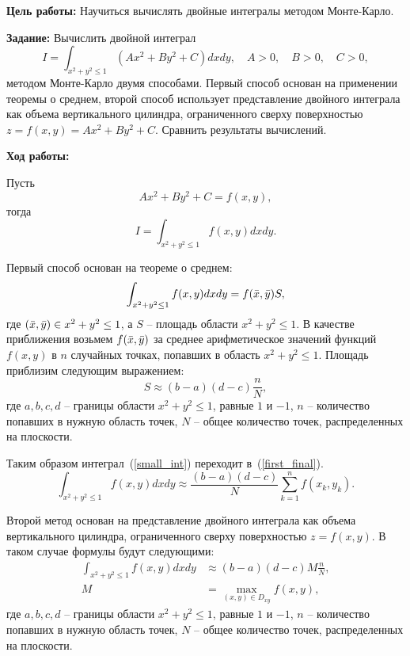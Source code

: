 \justifying
\textbf{Цель работы:}
Научиться вычислять двойные интегралы методом Монте-Карло.

\textbf{Задание:}
Вычислить двойной интеграл
\begin{equation}\label{init_int}
    I = \int_{x ^ 2 + y ^ 2 \leq 1} (A x ^ 2 + B y ^ 2 + C) dx dy, \quad A > 0, \quad B > 0, \quad C > 0,
\end{equation}
методом Монте-Карло двумя способами. Первый способ основан на применении теоремы о среднем, второй способ использует представление двойного интеграла как объема вертикального цилиндра, ограниченного сверху поверхностью $z = f(x, y) = A x ^ 2 + B y ^ 2 + C$. Сравнить результаты вычислений.

\textbf{Ход работы:}

Пусть
\begin{equation}
    A x ^ 2 + B y ^ 2 + C = f(x, y),
\end{equation}
тогда 
\begin{equation}\label{small_int}
    I = \int_{x ^ 2 + y ^ 2 \leq 1} f(x, y) dx dy.
\end{equation}

Первый способ основан на теореме о среднем:
\begin{equation}
    \int_{x ^ 2 + y ^ 2 \leq 1} f(x, y) dx dy = f(\Bar{x}, \Bar{y}) S,
\end{equation}
где $(\Bar{x}, \Bar{y}) \in x ^ 2 + y ^ 2 \leq 1$, а $S$ -- площадь области $x ^ 2 + y ^ 2 \leq 1$. В качестве приближения возьмем $f(\Bar{x}, \Bar{y})$ за среднее арифметическое значений функций $f(x, y)$ в $n$ случайных точках, попавших в область $x ^ 2 + y ^ 2 \leq 1$. Площадь приблизим следующим выражением:
\begin{equation}
    S \approx (b - a)(d - c) \frac{n}{N},
\end{equation}
где $a, b, c, d$ -- границы области $x ^ 2 + y ^ 2 \leq 1$, равные $1$ и $-1$, $n$ -- количество попавших в нужную область точек, $N$ -- общее количество точек, распределенных на плоскости.

Таким образом интеграл~(\ref{small_int}) переходит в~(\ref{first_final}).
\begin{equation}\label{first_final}
    \int_{x ^ 2 + y ^ 2 \leq 1} f(x, y) dx dy \approx \frac{(b - a)(d - c)}{N} \sum_{k = 1} ^ {n} f(x_k, y_k).
\end{equation}

Второй метод основан на представление двойного интеграла как объема вертикального цилиндра, ограниченного сверху поверхностью $z = f(x, y)$. В таком случае формулы будут следующими:
\begin{align}
    \int_{x ^ 2 + y ^ 2 \leq 1} f(x, y) dx dy &\approx (b - a)(d - c) M \frac{n}{N}, \\
    M &= \max_{(x, y) \in D_{xy}} f(x, y),
\end{align}
где $a, b, c, d$ -- границы области $x ^ 2 + y ^ 2 \leq 1$, равные $1$ и $-1$, $n$ -- количество попавших в нужную область точек, $N$ -- общее количество точек, распределенных на плоскости.

